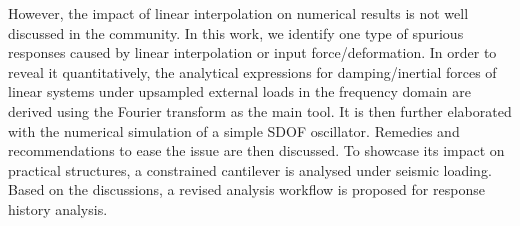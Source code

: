 However, the impact of linear interpolation on numerical results is not well discussed in the community. In this work, we identify one type of spurious responses caused by linear interpolation or input force/deformation. In order to reveal it quantitatively, the analytical expressions for damping/inertial forces of linear systems under upsampled external loads in the frequency domain are derived using the Fourier transform as the main tool. It is then further elaborated with the numerical simulation of a simple SDOF oscillator. Remedies and recommendations to ease the issue are then discussed. To showcase its impact on practical structures, a constrained cantilever is analysed under seismic loading. Based on the discussions, a revised analysis workflow is proposed for response history analysis.